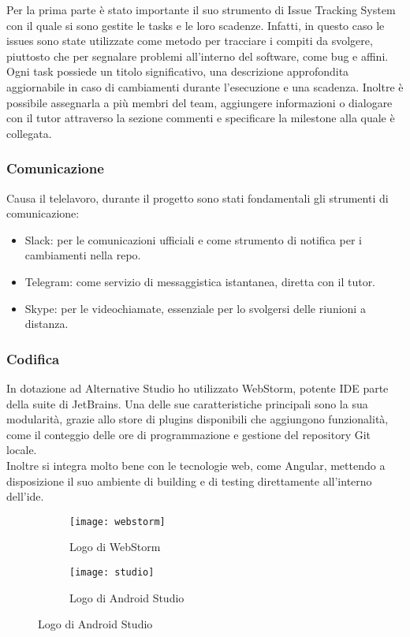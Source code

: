 \noindent Per la prima parte è stato importante il suo strumento di \gls{Issue Tracking System} con il quale si sono gestite le tasks e le
loro scadenze. Infatti, in questo caso le issues sono state utilizzate come metodo per tracciare i compiti da svolgere, piuttosto che per
segnalare problemi all'interno del software, come bug e affini. \\
\noindent Ogni task possiede un titolo significativo, una descrizione approfondita aggiornabile in caso di cambiamenti durante l'esecuzione
e una scadenza. Inoltre è possibile assegnarla a più membri del team, aggiungere informazioni o dialogare con il tutor attraverso la sezione
commenti e specificare la milestone alla quale è collegata.

\subsubsection{Comunicazione}
Causa il telelavoro, durante il progetto sono stati fondamentali gli strumenti di comunicazione:
\begin{itemize}
	\item Slack: per le comunicazioni ufficiali e come strumento di notifica per i cambiamenti nella repo.
	\item Telegram: come servizio di messaggistica istantanea, diretta con il tutor.
	\item Skype: per le videochiamate, essenziale per lo svolgersi delle riunioni a distanza.
\end{itemize}

\subsubsection{Codifica}
In dotazione ad Alternative Studio ho utilizzato WebStorm, potente IDE parte della suite di JetBrains. Una delle sue caratteristiche
principali sono la sua modularità, grazie allo store di plugins disponibili che aggiungono funzionalità, come il conteggio delle ore di
programmazione e gestione del repository \gls{Git} locale. \\
Inoltre si integra molto bene con le tecnologie web, come Angular, mettendo a disposizione il suo ambiente di building e di testing direttamente all'interno dell'\acrshort{ide}.

\begin{figure}[htbp]
	\begin{subfigure}{0.5\textwidth}
		\texttt{[image: webstorm]}
		\caption{Logo di WebStorm}
	\end{subfigure}
	\begin{subfigure}{0.5\textwidth}
		\texttt{[image: studio]}
		\caption{Logo di Android Studio}
	\end{subfigure}
\end{figure}

